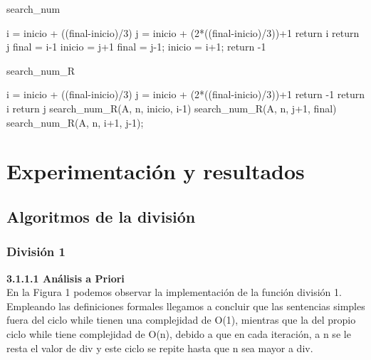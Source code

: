 \documentclass[12pt,twoside]{article}
\begin{document}
    \begin{algorithm}[H]
        \caption{search\_num}
        \begin{algorithmic}[1]
        \State i = inicio + ((final-inicio)/3)
        \State j = inicio + (2*((final-inicio)/3))+1
        \State return i
        \State return j
        \State final = i-1
        \State inicio = j+1
        \Else
        \State final = j-1;
        \State inicio = i+1;
        \EndIf
    	\EndWhile
    	\State return -1
        \end{algorithmic}
    \end{algorithm}
    \begin{algorithm}[H]
        \caption{search\_num\_R}
        \begin{algorithmic}[1]
        \State i = inicio + ((final-inicio)/3)
        \State j = inicio + (2*((final-inicio)/3))+1
            \State return -1
        \EndIf
            \State return i
            \State return j
            \State search\_num\_R(A, n, inicio, i-1)
            \State search\_num\_R(A, n, j+1, final)
        \Else
            \State search\_num\_R(A, n, i+1, j-1);
        \EndIf
        \end{algorithmic}
    \end{algorithm}
    \section{Experimentaci\'on y resultados}
        \subsection{Algoritmos de la divisi\'on}
            \subsubsection{\large Divisi\'on 1}
                {\bf 3.1.1.1 An\'alisis a Priori}
                \\[0.5cm]
                En la Figura 1 podemos observar la implementación de la función división 1. Empleando las definiciones formales llegamos a concluir que las sentencias simples fuera del ciclo while tienen una complejidad de O(1), mientras que la del propio ciclo while tiene complejidad de O(n), debido a que en cada iteración, a n se le resta el valor de div y este ciclo se repite hasta que n sea mayor a div.
                
\end{document}
